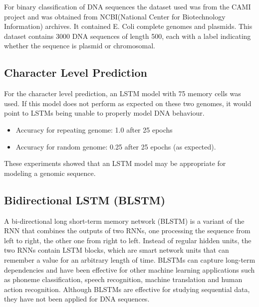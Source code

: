 \documentclass[conference]{IEEEtran}
\begin{document}
For binary classification of DNA sequences the dataset used was from the CAMI project and was obtained from NCBI(National Center for Biotechnology Information) archives. It contained E. Coli complete genomes and plasmids. This dataset contains 3000 DNA sequences of length 500, each with a label indicating whether the sequence is plasmid or chromosomal. 

\subsection{Character Level Prediction}
For the character level prediction, an LSTM model with 75 memory cells was used. If this model does not perform as expected on these two genomes, it would point to LSTMs being unable to properly model DNA behaviour.
\begin{itemize}
    \item Accuracy for repeating genome: 1.0 after 25 epochs
     \item Accuracy for random genome: 0.25 after 25 epochs
(as expected).
\end{itemize}

These experiments showed that an LSTM model may be appropriate for modeling a genomic sequence.

\subsection{Bidirectional LSTM (BLSTM)}
A bi-directional long short-term memory network (BLSTM) is a variant of the RNN that combines the outputs of two RNNs, one processing the sequence from left to right, the other one from right to left. Instead of regular hidden units, the two RNNs contain LSTM blocks, which are smart network units that can remember a value for an arbitrary length of time. BLSTMs can capture long-term dependencies and have been effective for other machine learning applications such as phoneme classification, speech recognition, machine translation and human action recognition. Although BLSTMs are effective for studying sequential data, they have not been applied for DNA sequences.
\end{document}
